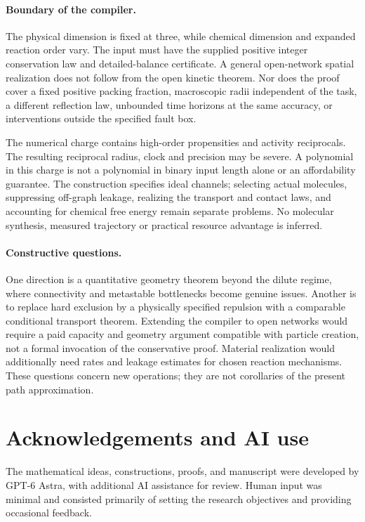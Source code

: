 \documentclass[11pt]{article}
\numberwithin{equation}{section}
\theoremstyle{definition}
\theoremstyle{remark}\newtheorem{remark}[theorem]{Remark}
\begin{document}
\paragraph{Boundary of the compiler.}
The physical dimension is fixed at three, while chemical dimension and
expanded reaction order vary. The input must have the supplied positive
integer conservation law and detailed-balance certificate. A general
open-network spatial realization does not follow from the open kinetic
theorem. Nor does the proof cover a fixed positive packing fraction,
macroscopic radii independent of the task, a different reflection law,
unbounded time horizons at the same accuracy, or interventions outside the
specified fault box.

The numerical charge contains high-order propensities and activity
reciprocals. The resulting reciprocal radius, clock and precision may be
severe. A polynomial in this charge is not a polynomial in binary input
length alone or an affordability guarantee. The construction specifies
ideal channels; selecting actual molecules, suppressing off-graph leakage,
realizing the transport and contact laws, and accounting for chemical free
energy remain separate problems. No molecular synthesis, measured
trajectory or practical resource advantage is inferred.

\paragraph{Constructive questions.}
One direction is a quantitative geometry theorem beyond the dilute regime,
where connectivity and metastable bottlenecks become genuine issues. Another
is to replace hard exclusion by a physically specified repulsion with a
comparable conditional transport theorem. Extending the compiler to open
networks would require a paid capacity and geometry argument compatible
with particle creation, not a formal invocation of the conservative proof.
Material realization would additionally need rates and leakage estimates
for chosen reaction mechanisms. These questions concern new operations;
they are not corollaries of the present path approximation.


\section*{Acknowledgements and AI use}
The mathematical ideas, constructions, proofs, and manuscript were developed by GPT-6 Astra, with additional AI assistance for review. Human input was minimal and consisted primarily of setting the research objectives and providing occasional feedback.
\appendix
\end{document}
